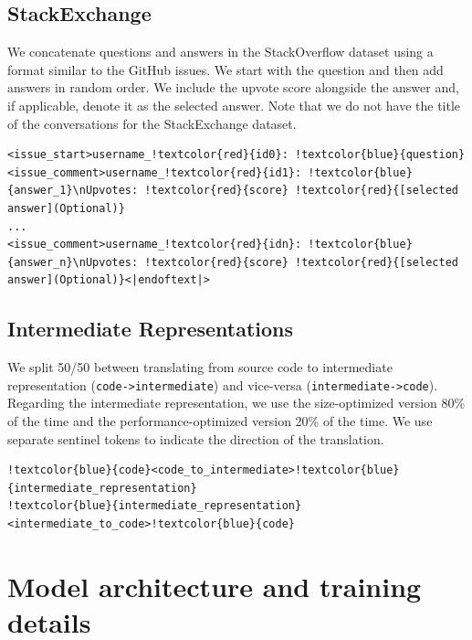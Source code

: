 \documentclass[10pt]{article} %
\begin{document}
\subsection{StackExchange}
We concatenate questions and answers in the StackOverflow dataset using a format similar to the GitHub issues. We start with the question and then add answers in random order. We include the upvote score alongside the answer and, if applicable, denote it as the selected answer. Note that we do not have the title of the conversations for the StackExchange dataset. 
\begin{Verbatim}[commandchars=!\{\}]
<issue_start>username_!textcolor{red}{id0}: !textcolor{blue}{question}
<issue_comment>username_!textcolor{red}{id1}: !textcolor{blue}{answer_1}\nUpvotes: !textcolor{red}{score} !textcolor{red}{[selected answer](Optional)}
...
<issue_comment>username_!textcolor{red}{idn}: !textcolor{blue}{answer_n}\nUpvotes: !textcolor{red}{score} !textcolor{red}{[selected answer](Optional)}<|endoftext|>
\end{Verbatim}

\subsection{Intermediate Representations}
We split 50/50 between translating from source code to intermediate representation (\verb|code->intermediate|) and vice-versa (\verb|intermediate->code|). Regarding the intermediate representation, we use the size-optimized version 80\% of the time and the performance-optimized version 20\% of the time. We use separate sentinel tokens to indicate the direction of the translation. 

\begin{Verbatim}[commandchars=!\{\}]
!textcolor{blue}{code}<code_to_intermediate>!textcolor{blue}{intermediate_representation}
!textcolor{blue}{intermediate_representation}<intermediate_to_code>!textcolor{blue}{code}
\end{Verbatim}




\section{Model architecture and training details}
\end{document}
